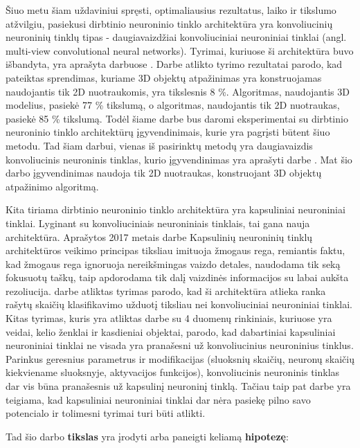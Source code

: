 Šiuo metu šiam uždaviniui spręsti, optimaliausius  rezultatus, laiko ir tikslumo atžvilgiu, pasiekusi dirbtinio neuroninio tinklo architektūra yra konvoliucinių neuroninių tinklų tipas - daugiavaizdžiai konvoliuciniai neuroniniai tinklai (angl. multi-view convolutional neural networks). Tyrimai, kuriuose ši architektūra buvo išbandyta, yra aprašyta darbuose \cite{cnnExp1, cnnExp2}. Darbe \cite{dbnExp} atlikto tyrimo rezultatai parodo, kad pateiktas sprendimas, kuriame 3D objektų atpažinimas yra konstruojamas naudojantis tik 2D nuotraukomis, yra tikslesnis 8 \%. Algoritmas, naudojantis 3D modelius, pasiekė 77 \% tikslumą, o algoritmas, naudojantis tik 2D nuotraukas, pasiekė 85 \% tikslumą. Todėl šiame darbe bus daromi eksperimentai su dirbtinio neuroninio tinklo architektūrų įgyvendinimais, kurie yra pagrįsti būtent šiuo metodu. Tad šiam darbui, vienas iš pasirinktų metodų yra daugiavaizdis konvoliucinis neuroninis tinklas, kurio įgyvendinimas yra aprašyti darbe \cite{cnnExp1}. Mat šio darbo įgyvendinimas naudoja tik 2D nuotraukas, konstruojant 3D objektų atpažinimo algoritmą.

Kita tiriama dirbtinio neuroninio tinklo architektūra yra kapsuliniai neuroniniai tinklai. Lyginant su konvoliuciniais neuroniniais tinklais, tai gana nauja architektūra. Aprašytos 2017 metais \cite{capsNet} darbe Kapsulinių neuroninių tinklų architektūros veikimo principas tiksliau imituoja žmogaus rega, remiantis faktu, kad žmogaus rega ignoruoja nereikšmingas vaizdo detales, naudodama tik seką fokusuotų taškų, taip apdorodama tik dalį vaizdinės informacijos su labai aukšta rezoliucija. \cite{capsNet} darbe atliktas tyrimas parodo, kad ši architektūra atlieka ranka rašytų skaičių klasifikavimo užduotį tiksliau nei konvoliuciniai neuroniniai tinklai. Kitas tyrimas, kuris yra atliktas darbe \cite{capsCNN} su 4 duomenų rinkiniais, kuriuose yra veidai, kelio ženklai ir kasdieniai objektai, parodo, kad dabartiniai kapsuliniai neuroniniai tinklai ne visada yra pranašesni už konvoliucinius neuroninius tinklus. Parinkus geresnius parametrus ir modifikacijas (sluoksnių skaičių, neuronų skaičių kiekviename sluoksnyje, aktyvacijos funkcijos), konvoliucinis neuroninis tinklas dar vis būna pranašesnis už kapsulinį neuroninį tinklą. Tačiau taip pat darbe \cite{capsCNN} yra teigiama, kad kapsuliniai neuroniniai tinklai dar nėra pasiekę pilno savo potencialo ir tolimesni tyrimai turi būti atlikti.

Tad šio darbo \textbf{tikslas} yra įrodyti arba paneigti keliamą \textbf{hipotezę}:

